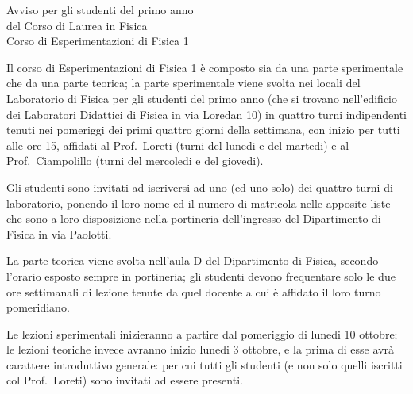 \documentclass[a4paper]{article}
\begin{document}

\newcommand{\bsi}[2]{\fontsize{#1}{#2}}

\bsi{16pt}{20pt}
\begin{center}
\vspace*{8mm}
  Avviso per gli studenti del primo anno \\
  del Corso di Laurea in Fisica \\[2ex]
  Corso di Esperimentazioni di Fisica 1
\end{center}
\vspace*{8mm}

\bsi{12pt}{15pt}
Il corso di Esperimentazioni di Fisica 1 \`e composto
sia da una parte sperimentale che da una parte teorica;
la parte sperimentale viene svolta nei locali del
Laboratorio di Fisica per gli studenti del primo anno
(che si trovano nell'edificio dei Laboratori Didattici
di Fisica in via Loredan 10) in quattro turni
indipendenti tenuti nei pomeriggi dei primi quattro
giorni della settimana, con inizio per tutti alle ore
15, affidati al Prof.\ Loreti (turni del lunedi e del
martedi) e al Prof.\ Ciampolillo (turni del mercoledi
e del giovedi).

Gli studenti sono invitati ad iscriversi ad uno (ed
uno solo) dei quattro turni di laboratorio, ponendo
il loro nome ed il numero di matricola nelle apposite
liste che sono a loro disposizione nella portineria
dell'ingresso del Dipartimento di Fisica in via
Paolotti.

La parte teorica viene svolta nell'aula D del
Dipartimento di Fisica, secondo l'orario esposto
sempre in portineria; gli studenti devono frequentare
solo le due ore settimanali di lezione tenute
da quel docente a cui \`e affidato il loro turno
pomeridiano.

Le lezioni sperimentali inizieranno a partire dal
pomeriggio di lunedi 10 ottobre; le lezioni teoriche
invece avranno inizio lunedi 3 ottobre, e la prima
di esse avr\`a carattere introduttivo generale: per
cui tutti gli studenti (e non solo quelli
iscritti col Prof.\ Loreti) sono invitati ad essere
presenti.
\end{document}

